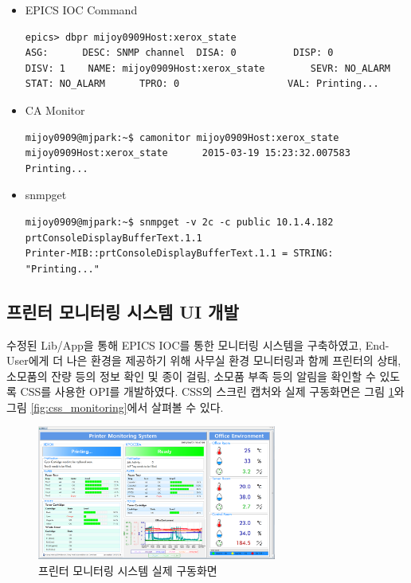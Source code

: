 \documentclass[11pt
  , a4paper
  , article
  , oneside
]{memoir}
\begin{document}
\begin{itemize}
\item EPICS IOC Command\\
{\scriptsize
\begin{lstlisting}[style=termstyle]
epics> dbpr mijoy0909Host:xerox_state
ASG:      DESC: SNMP channel  DISA: 0          DISP: 0             
DISV: 1    NAME: mijoy0909Host:xerox_state        SEVR: NO_ALARM      
STAT: NO_ALARM      TPRO: 0                   VAL: Printing...    
\end{lstlisting}
}
\item CA Monitor\\
{\scriptsize
\begin{lstlisting}[style=termstyle]
mijoy0909@mjpark:~$ camonitor mijoy0909Host:xerox_state
mijoy0909Host:xerox_state      2015-03-19 15:23:32.007583 Printing...  
\end{lstlisting}
}
\item snmpget\\
{\scriptsize
\begin{lstlisting}[style=termstyle]
mijoy0909@mjpark:~$ snmpget -v 2c -c public 10.1.4.182 prtConsoleDisplayBufferText.1.1
Printer-MIB::prtConsoleDisplayBufferText.1.1 = STRING: "Printing..."
\end{lstlisting}
}
\end{itemize}

\clearpage

\subsection{프린터 모니터링 시스템 UI 개발}
수정된 Lib/App을 통해 EPICS IOC를 통한 모니터링 시스템을 구축하였고, End-User에게 더 나은 환경을 제공하기 위해 사무실 환경 모니터링과 함께 프린터의 상태, 소모품의 잔량 등의 정보 확인 및 종이 걸림, 소모품 부족 등의 알림을 확인할 수 있도록 CSS를 사용한 OPI를 개발하였다. CSS의 스크린 캡처와 실제 구동화면은 그림 \ref{fig:css_op}와 그림 \ref{fig:css_monitoring}에서 살펴볼 수 있다.

\begin{figure}[h!]
  \centering
  \includegraphics[width=0.7\textwidth]{./images/css_op.eps}
  \caption{프린터 모니터링 시스템 실제 구동화면}
  \label{fig:css_op}   
\end{figure}
\end{document}
